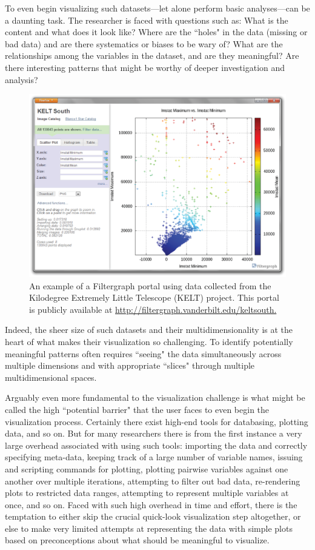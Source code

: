 To even begin visualizing such datasets---let alone perform basic analyses---can be a daunting task. The researcher is faced with questions such as: What is the content and what does it look like? Where are the ``holes" in the data (missing or bad data) and are there systematics or biases to be wary of? What are the relationships among the variables in the dataset, and are they meaningful? Are there interesting patterns that might be worthy of deeper investigation and analysis?

\begin{figure}
\includegraphics[width=120mm]{part11/Burger_F2/F2_f1.eps}
\caption{An example of a Filtergraph portal using data collected from the Kilodegree Extremely Little Telescope (KELT) project. This portal is publicly available at \url{http://filtergraph.vanderbilt.edu/keltsouth.}}
\end{figure}

Indeed, the sheer size of such datasets and their multidimensionality is at the heart of what makes their visualization so challenging. To identify potentially meaningful patterns often requires ``seeing" the data simultaneously across multiple dimensions and with appropriate ``slices" through multiple multidimensional spaces.

Arguably even more fundamental to the visualization challenge is what might be called the high ``potential barrier" that the user faces to even begin the visualization process. Certainly there exist high-end tools for databasing, plotting data, and so on. But for many researchers there is from the first instance a very large overhead associated with using such tools: importing the data and correctly specifying meta-data, keeping track of a large number of variable names, issuing and scripting commands for plotting, plotting pairwise variables against one another over multiple iterations, attempting to filter out bad data, re-rendering plots to restricted data ranges, attempting to represent multiple variables at once, and so on. Faced with such high overhead in time and effort, there is the temptation to either skip the crucial quick-look visualization step altogether, or else to make very limited attempts at representing the data with simple plots based on preconceptions about what should be meaningful to visualize.

